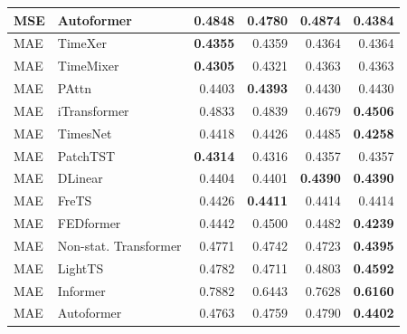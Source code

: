 \begin{longtable}{llrrrr}
MSE & Autoformer & 0.4848 & 0.4780 & 0.4874 & \textbf{0.4384} \\
\midrule
MAE & TimeXer & \textbf{0.4355} & 0.4359 & 0.4364 & 0.4364 \\
MAE & TimeMixer & \textbf{0.4305} & 0.4321 & 0.4363 & 0.4363 \\
MAE & PAttn & 0.4403 & \textbf{0.4393} & 0.4430 & 0.4430 \\
MAE & iTransformer & 0.4833 & 0.4839 & 0.4679 & \textbf{0.4506} \\
MAE & TimesNet & 0.4418 & 0.4426 & 0.4485 & \textbf{0.4258} \\
MAE & PatchTST & \textbf{0.4314} & 0.4316 & 0.4357 & 0.4357 \\
MAE & DLinear & 0.4404 & 0.4401 & \textbf{0.4390} & \textbf{0.4390} \\
MAE & FreTS & 0.4426 & \textbf{0.4411} & 0.4414 & 0.4414 \\
MAE & FEDformer & 0.4442 & 0.4500 & 0.4482 & \textbf{0.4239} \\
MAE & Non-stat. Transformer & 0.4771 & 0.4742 & 0.4723 & \textbf{0.4395} \\
MAE & LightTS & 0.4782 & 0.4711 & 0.4803 & \textbf{0.4592} \\
MAE & Informer & 0.7882 & 0.6443 & 0.7628 & \textbf{0.6160} \\
MAE & Autoformer & 0.4763 & 0.4759 & 0.4790 & \textbf{0.4402} \\
\end{longtable}
\endgroup

